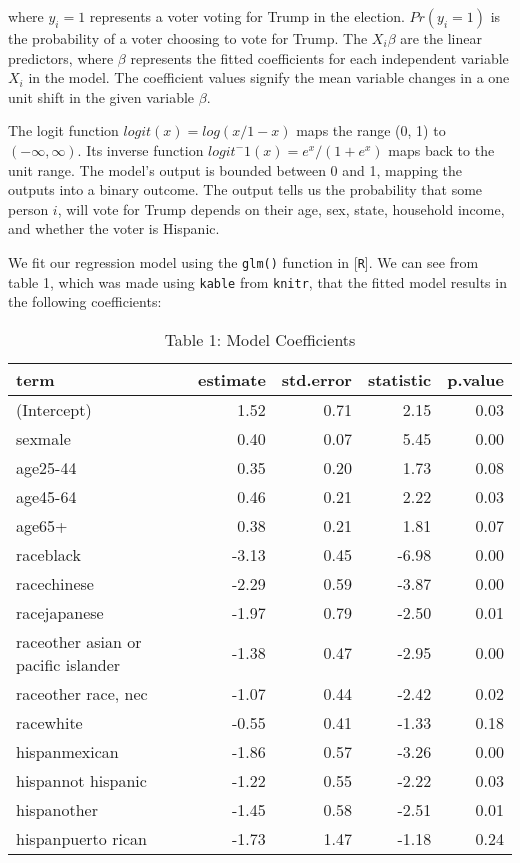 \documentclass[
]{article}
\begin{document}
where \(y_i = 1\) represents a voter voting for Trump in the election.
\(Pr(y_i = 1)\) is the probability of a voter choosing to vote for Trump.
The \(X_i\beta\) are the linear predictors, where \(\beta\) represents the fitted coefficients for each independent variable \(X_i\) in the model. The coefficient values signify the mean variable changes in a one unit shift in the given variable \(\beta\).

The logit function \(logit(x) = log(x/1-x)\) maps the range (0, 1) to \((-\infty, \infty)\).
Its inverse function \(logit^-1(x) = e^x/(1+e^x)\) maps back to the unit range.
The model's output is bounded between 0 and 1, mapping the outputs into a binary outcome. The output tells us the probability that some person \(i\), will vote for Trump depends on their age, sex, state, household income, and whether the voter is Hispanic.

We fit our regression model using the \texttt{glm()} function in {[}\texttt{R}{]}. We can see from table 1, which was made using \texttt{kable} from \texttt{knitr}, that the fitted model results in the following coefficients:

\begin{table}

\caption{\label{tab:unnamed-chunk-1} Table 1: Model Coefficients}
\centering
\begin{tabular}[t]{l|r|r|r|r}
\hline
term & estimate & std.error & statistic & p.value\\
\hline
(Intercept) & 1.52 & 0.71 & 2.15 & 0.03\\
\hline
sexmale & 0.40 & 0.07 & 5.45 & 0.00\\
\hline
age25-44 & 0.35 & 0.20 & 1.73 & 0.08\\
\hline
age45-64 & 0.46 & 0.21 & 2.22 & 0.03\\
\hline
age65+ & 0.38 & 0.21 & 1.81 & 0.07\\
\hline
raceblack & -3.13 & 0.45 & -6.98 & 0.00\\
\hline
racechinese & -2.29 & 0.59 & -3.87 & 0.00\\
\hline
racejapanese & -1.97 & 0.79 & -2.50 & 0.01\\
\hline
raceother asian or pacific islander & -1.38 & 0.47 & -2.95 & 0.00\\
\hline
raceother race, nec & -1.07 & 0.44 & -2.42 & 0.02\\
\hline
racewhite & -0.55 & 0.41 & -1.33 & 0.18\\
\hline
hispanmexican & -1.86 & 0.57 & -3.26 & 0.00\\
\hline
hispannot hispanic & -1.22 & 0.55 & -2.22 & 0.03\\
\hline
hispanother & -1.45 & 0.58 & -2.51 & 0.01\\
\hline
hispanpuerto rican & -1.73 & 1.47 & -1.18 & 0.24\\
\hline
\end{tabular}
\end{table}
\end{document}
